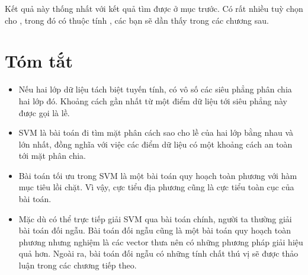 Kết quả này thống nhất với kết quả tìm được ở mục trước. Có rất nhiều tuỳ chọn cho , trong đó có thuộc tính
, các bạn sẽ dần thấy trong các chương sau.


\section{Tóm tắt}
\begin{itemize}
\item Nếu hai lớp dữ liệu tách biệt tuyến tính, có vô số các siêu phẳng phân chia hai lớp đó.
Khoảng cách gần nhất từ một điểm dữ liệu tới siêu phẳng này được gọi là
lề.

\item SVM là bài toán đi tìm mặt phân cách sao cho
lề của hai lớp bằng nhau và lớn nhất, đồng nghĩa với việc các điểm dữ liệu có
một {khoảng cách an toàn} tới mặt phân chia.

\item Bài toán tối ưu trong SVM là một bài toán quy hoạch toàn phương với hàm mục
tiêu lồi chặt. Vì vậy, cực tiểu địa phương cũng là
cực tiểu toàn cục của bài toán.

\item Mặc dù có thể trực tiếp giải SVM qua bài toán chính, người ta thường giải bài toán đối ngẫu. Bài toán
đối ngẫu cũng là một bài toán quy hoạch toàn phương nhưng nghiệm là các vector thưa nên có những
phương pháp giải hiệu quả hơn. Ngoài ra, bài toán đối ngẫu có những tính chất thú vị sẽ được thảo luận trong các chương tiếp theo.
\end{itemize}





